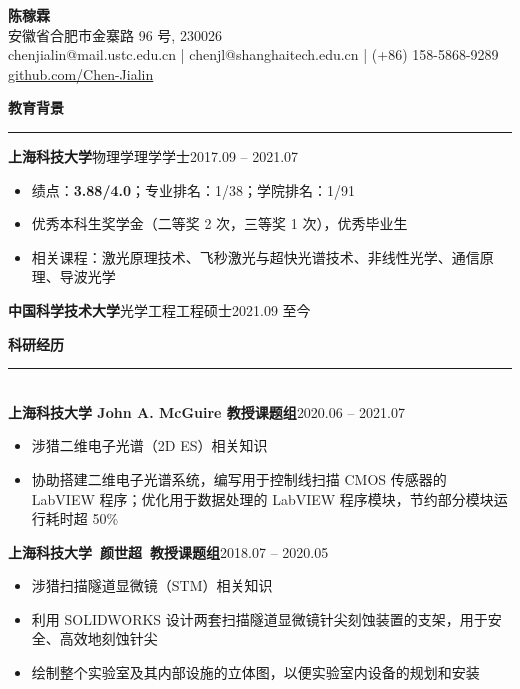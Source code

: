 \documentclass[letterpaper,11pt]{article}
\begin{document}
\begin{center}
    {\LARGE\bfseries{}陈稼霖}\\
    \vspace{1ex}
    安徽省合肥市金寨路 96 号, 230026\\
    chenjialin@mail.ustc.edu.cn | chenjl@shanghaitech.edu.cn | (+86) 158-5868-9289\\
    \href{https://github.com/Chen-Jialin}{github.com/Chen-Jialin}\\
\end{center}

{\Large\bfseries{}教育背景}\\
\rule[1.5ex]{\textwidth}{1pt}
{\songti\large\bfseries{}上海科技大学}{\large\quad{}物理学\quad{}理学学士}\hfill{2017.09 -- 2021.07}\\
\vspace{-4ex}
\begin{itemize}
    \item 绩点：{\bfseries{}3.88/4.0}；专业排名：1/38；学院排名：1/91
    \item 优秀本科生奖学金（二等奖 2 次，三等奖 1 次），优秀毕业生
    \item 相关课程：激光原理技术、飞秒激光与超快光谱技术、非线性光学、通信原理、导波光学
\end{itemize}
{\songti\large\bfseries{}中国科学技术大学}{\large\quad{}光学工程\quad{}工程硕士}\hfill{2021.09 至今}\\
\vspace{-1ex}%

{\Large\bfseries{}科研经历}\\
\rule[1.5ex]{\columnwidth}{1pt}\\
{\songti\large\bfseries{}上海科技大学 John A. McGuire 教授课题组}\hfill{2020.06 -- 2021.07}\\
\vspace{-4ex}
\begin{itemize}
    \item 涉猎二维电子光谱（2D ES）相关知识
    \item 协助搭建二维电子光谱系统，编写用于控制线扫描 CMOS 传感器的 LabVIEW 程序；优化用于数据处理的 LabVIEW 程序模块，节约部分模块运行耗时超 50\%
\end{itemize}
{\songti\large\bfseries{}上海科技大学~颜世超~教授课题组}\hfill{2018.07 -- 2020.05}\\
\vspace{-4ex}
\begin{itemize}
    \item 涉猎扫描隧道显微镜（STM）相关知识
    \item 利用 SOLIDWORKS 设计两套扫描隧道显微镜针尖刻蚀装置的支架，用于安全、高效地刻蚀针尖
    \item 绘制整个实验室及其内部设施的立体图，以便实验室内设备的规划和安装
\end{itemize}
\vspace{1ex}
\end{document}
